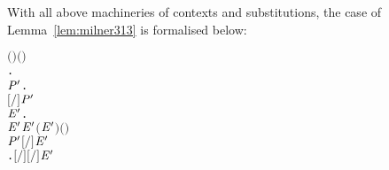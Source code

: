 With all above machineries of \multivariate contexts and substitutions,
the \multivariate case of Lemma~\ref{lem:milner313} is formalised below:
\begin{alltt}
\HOLTokenTurnstile{}    \HOLSymConst{\HOLTokenConj{}}   \HOLSymConst{\HOLTokenSubset{}}   \HOLSymConst{\HOLTokenConj{}}  \ensuremath{(} \ensuremath{)} \ensuremath{(} \ensuremath{)} \HOLSymConst{\HOLTokenImp{}}
   \HOLSymConst{\HOLTokenForall{}}.
         \HOLSymConst{\ensuremath{=}}   \HOLSymConst{\HOLTokenImp{}}
       \HOLSymConst{\HOLTokenForall{}} \ensuremath{\HOLBoundVar{P}\sp{\prime}}.
           \ensuremath{[}\ensuremath{/}\ensuremath{]}  \HOLTokenTransBegin{}\HOLTokenTransEnd \ensuremath{\HOLBoundVar{P}\sp{\prime}} \HOLSymConst{\HOLTokenImp{}}
           \HOLSymConst{\HOLTokenExists{}}\ensuremath{\HOLBoundVar{E}\sp{\prime}}.
                 \ensuremath{\HOLBoundVar{E}\sp{\prime}} \HOLSymConst{\HOLTokenConj{}}  \ensuremath{\HOLBoundVar{E}\sp{\prime}} \HOLSymConst{\HOLTokenSubset{}}   \HOLSymConst{\HOLTokenConj{}}  \ensuremath{(} \ensuremath{\HOLBoundVar{E}\sp{\prime}}\ensuremath{)} \ensuremath{(} \ensuremath{)} \HOLSymConst{\HOLTokenConj{}}
               \ensuremath{\HOLBoundVar{P}\sp{\prime}} \HOLSymConst{\ensuremath{=}} \ensuremath{[}\ensuremath{/}\ensuremath{]} \ensuremath{\HOLBoundVar{E}\sp{\prime}} \HOLSymConst{\HOLTokenConj{}}
               \HOLSymConst{\HOLTokenForall{}}.   \HOLSymConst{\ensuremath{=}}   \HOLSymConst{\HOLTokenImp{}} \ensuremath{[}\ensuremath{/}\ensuremath{]}  \HOLTokenTransBegin{}\HOLTokenTransEnd \ensuremath{[}\ensuremath{/}\ensuremath{]} \ensuremath{\HOLBoundVar{E}\sp{\prime}}
\end{alltt}

